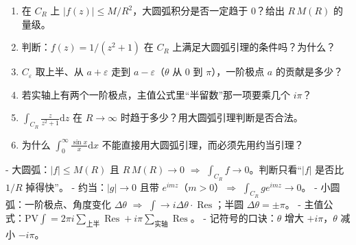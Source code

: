 \documentclass[11pt]{ctexart}
\let\orighdr\hdr
\renewcommand{\hdr}[2]{\par\orighdr{#1}{#2}}
\begin{document}








\begin{enumerate}
\item 在 $C_R$ 上 $|f(z)|\le M/R^{2}$，大圆弧积分是否一定趋于 0？给出 $R\,M(R)$ 的量级。
\item 判断：$f(z)=1/(z^{2}+1)$ 在 $C_R$ 上满足大圆弧引理的条件吗？为什么？
\item $C_\varepsilon$ 取上半、从 $a+\varepsilon$ 走到 $a-\varepsilon$（$\theta$ 从 $0$ 到 $\pi$），一阶极点 $a$ 的贡献是多少？
\item 若实轴上有两个一阶极点，主值公式里“半留数”那一项要乘几个 $i\pi$？
\item $\displaystyle\int_{C_R}\frac{z}{z^{2}+1}\mathrm{d}z$ 在 $R\to\infty$ 时趋于多少？用大圆弧引理判断是否合法。
\item 为什么 $\int_0^{\infty}\frac{\sin x}{x}\mathrm{d}x$ 不能直接用大圆弧引理，而必须先用约当引理？
\end{enumerate}


- 大圆弧：$|f|\le M(R)$ 且 $R\,M(R)\to0$ $\Longrightarrow$ $\int_{C_R}f\to0$。判断只看“$|f|$ 是否比 $1/R$ 掉得快”。
- 约当：$|g|\to0$ 且带 $e^{imz}$（$m>0$）$\Longrightarrow$ $\int_{C_R}ge^{imz}\to0$。
- 小圆弧：一阶极点、角度变化 $\Delta\theta$ $\Longrightarrow$ $\int\to i\Delta\theta\cdot\operatorname{Res}$；半圆 $\Delta\theta=\pm\pi$。
- 主值公式：$\mathrm{PV}\!\int=2\pi i\sum_{\text{上半}}\operatorname{Res}+i\pi\sum_{\text{实轴}}\operatorname{Res}$。
- 记符号的口诀：$\theta$ 增大 $+i\pi$，$\theta$ 减小 $-i\pi$。

\flowerrule

\end{document}
